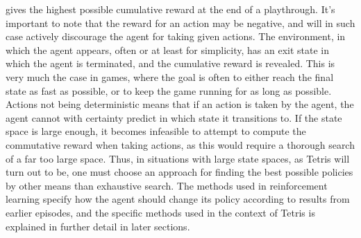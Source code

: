 gives the highest possible cumulative reward at the end of a playthrough. 
It's important to note that the reward 
for an action may be negative, and will in such case actively discourage 
the agent for taking given actions.
The environment, in which the agent appears, often 
or at least for simplicity, has an exit state
in which the agent is terminated, and the cumulative reward 
is revealed. This is very much the case in games, where the goal 
is often to either reach the final state as fast as possible,
or to keep the game running for as long as possible.
 Actions not being deterministic
means that if an action is taken by the agent, the agent cannot 
with certainty predict in which state it transitions to.
If the state space 
is large enough, it becomes infeasible to attempt to compute 
the commutative reward when taking actions, as this would require
a thorough search of a far too large space. Thus, in situations 
with large state spaces, as Tetris will turn out to be, one must choose 
an approach for finding the best possible policies by other
means than exhaustive search. The methods used in reinforcement learning 
specify how the agent should change its policy according to 
results from earlier episodes, and the specific methods used in
the context of Tetris is explained in further detail in later sections.













